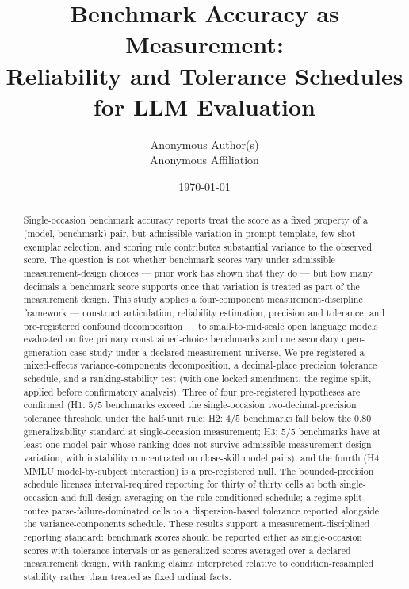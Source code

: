 \documentclass[11pt]{article}
\title{Benchmark Accuracy as Measurement:\\
       Reliability and Tolerance Schedules for LLM Evaluation}
\author{Anonymous Author(s)\\
        Anonymous Affiliation}
\date{\today}
\begin{document}
\maketitle


\begin{abstract}
Single-occasion benchmark accuracy reports treat the score as a fixed property of a (model, benchmark) pair, but admissible variation in prompt template, few-shot exemplar selection, and scoring rule contributes substantial variance to the observed score. The question is not whether benchmark scores vary under admissible measurement-design choices --- prior work has shown that they do --- but how many decimals a benchmark score supports once that variation is treated as part of the measurement design. This study applies a four-component measurement-discipline framework --- construct articulation, reliability estimation, precision and tolerance, and pre-registered confound decomposition --- to small-to-mid-scale open language models evaluated on five primary constrained-choice benchmarks and one secondary open-generation case study under a declared measurement universe. We pre-registered a mixed-effects variance-components decomposition, a decimal-place precision tolerance schedule, and a ranking-stability test (with one locked amendment, the regime split, applied before confirmatory analysis). Three of four pre-registered hypotheses are confirmed (H1: $5/5$ benchmarks exceed the single-occasion two-decimal-precision tolerance threshold under the half-unit rule; H2: $4/5$ benchmarks fall below the $0.80$ generalizability standard at single-occasion measurement; H3: $5/5$ benchmarks have at least one model pair whose ranking does not survive admissible measurement-design variation, with instability concentrated on close-skill model pairs), and the fourth (H4: MMLU model-by-subject interaction) is a pre-registered null. The bounded-precision schedule licenses interval-required reporting for thirty of thirty cells at both single-occasion and full-design averaging on the rule-conditioned schedule; a regime split routes parse-failure-dominated cells to a dispersion-based tolerance reported alongside the variance-components schedule. These results support a measurement-disciplined reporting standard: benchmark scores should be reported either as single-occasion scores with tolerance intervals or as generalized scores averaged over a declared measurement design, with ranking claims interpreted relative to condition-resampled stability rather than treated as fixed ordinal facts.
\end{abstract}
\end{document}
